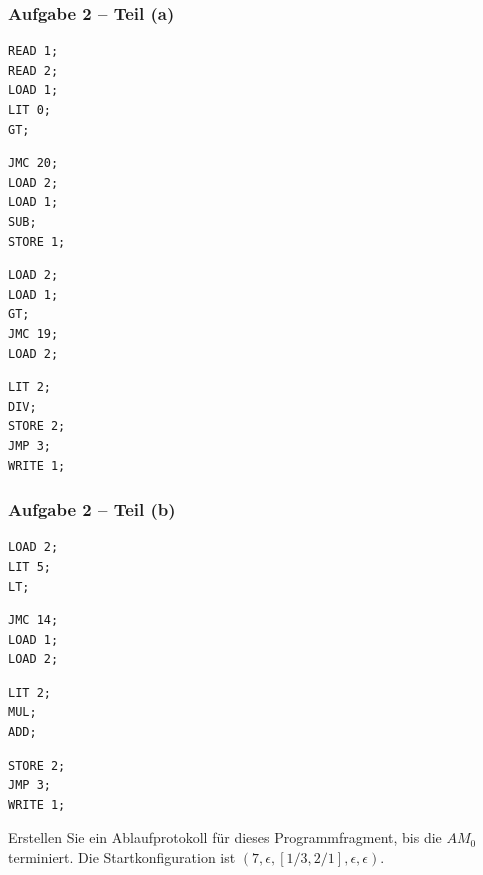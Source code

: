 \documentclass{beamer}
\begin{document}
\begin{frame}[fragile] \frametitle{Aufgabe 2 -- Teil (a)}
	\begin{minipage}{\dimexpr0.25\linewidth-\fboxrule-\fboxsep}
		\begin{lstlisting}[firstnumber=1]
READ 1;
READ 2;
LOAD 1;
LIT 0;
GT;
		\end{lstlisting}
	\end{minipage}
	\begin{minipage}{\dimexpr0.25\linewidth-\fboxrule-\fboxsep}
		\begin{lstlisting}[firstnumber=6]
JMC 20;
LOAD 2;
LOAD 1;
SUB;
STORE 1;
		\end{lstlisting}
	\end{minipage}
	\begin{minipage}{\dimexpr0.25\linewidth-\fboxrule-\fboxsep}
		\begin{lstlisting}[firstnumber=11]
LOAD 2;
LOAD 1;
GT;
JMC 19;
LOAD 2;
		\end{lstlisting}
	\end{minipage}
	\begin{minipage}{\dimexpr0.25\linewidth-\fboxrule-\fboxsep}
		\begin{lstlisting}[firstnumber=16]
LIT 2;
DIV;
STORE 2;
JMP 3;
WRITE 1;
		\end{lstlisting}
	\end{minipage}
\end{frame}


\begin{frame}[fragile] \frametitle{Aufgabe 2 -- Teil (b)}
	\begin{minipage}{\dimexpr0.25\linewidth-\fboxrule-\fboxsep}
		\begin{lstlisting}[firstnumber=3]
LOAD 2;
LIT 5; 
LT;
		\end{lstlisting}
	\end{minipage}
	\begin{minipage}{\dimexpr0.25\linewidth-\fboxrule-\fboxsep}
		\begin{lstlisting}[firstnumber=6]
JMC 14; 
LOAD 1; 
LOAD 2;
		\end{lstlisting}
	\end{minipage}
	\begin{minipage}{\dimexpr0.25\linewidth-\fboxrule-\fboxsep}
		\begin{lstlisting}[firstnumber=9]
LIT 2;
MUL; 
ADD;
		\end{lstlisting}
	\end{minipage}
	\begin{minipage}{\dimexpr0.25\linewidth-\fboxrule-\fboxsep}
		\begin{lstlisting}[firstnumber=12]
STORE 2; 
JMP 3; 
WRITE 1;
		\end{lstlisting}
	\end{minipage}

	\bigskip 
	
	Erstellen Sie ein Ablaufprotokoll für dieses Programmfragment, bis die $AM_0$ terminiert. Die Startkonfiguration ist $(7, \epsilon, [1/3, 2/1], \epsilon, \epsilon)$.
\end{frame}
\end{document}
